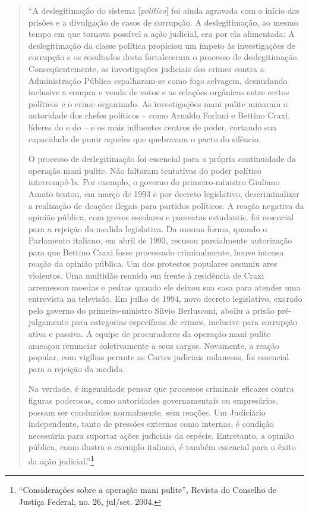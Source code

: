 \begin{quote}
``A deslegitimação do sistema {[}\emph{político}{]} foi ainda agravada
com o início das prisões e a divulgação de casos de corrupção. A
deslegitimação, ao mesmo tempo em que tornava possível a ação judicial,
era por ela alimentada: A deslegitimação da classe política propiciou um
ímpeto às investigações de corrupção e os resultados desta fortaleceram
o processo de deslegitimação. Conseqüentemente, as investigações
judiciais dos crimes contra a Administração Pública espalharam-se como
fogo selvagem, desnudando inclusive a compra e venda de votos e as
relações orgânicas entre certos políticos e o crime organizado. As
investigações mani pulite minaram a autoridade dos chefes políticos --
como Arnaldo Forlani e Bettino Craxi, líderes do  e do  -- e os
mais influentes centros de poder, cortando sua capacidade de punir
aqueles que quebravam o pacto do silêncio.

O processo de deslegitimação foi essencial para a própria continuidade
da operação mani pulite. Não faltaram tentativas do poder político
interrompê-la. Por exemplo, o governo do primeiro-ministro Giuliano
Amato tentou, em março de 1993 e por decreto legislativo,
descriminalizar a realização de doações ilegais para partidos políticos.
A reação negativa da opinião pública, com greves escolares e passeatas
estudantis, foi essencial para a rejeição da medida legislativa. Da
mesma forma, quando o Parlamento italiano, em abril de 1993, recusou
parcialmente autorização para que Bettino Craxi fosse processado
criminalmente, houve intensa reação da opinião pública. Um dos protestos
populares assumiu ares violentos. Uma multidão reunida em frente à
residência de Craxi arremessou moedas e pedras quando ele deixou sua
casa para atender uma entrevista na televisão. Em julho de 1994, novo
decreto legislativo, exarado pelo governo do primeiro-ministro Silvio
Berlusconi, aboliu a prisão pré-julgamento para categorias específicas
de crimes, inclusive para corrupção ativa e passiva. A equipe de
procuradores da operação mani pulite ameaçou renunciar coletivamente a
seus cargos. Novamente, a reação popular, com vigílias perante as Cortes
judiciais milanesas, foi essencial para a rejeição da medida.

Na verdade, é ingenuidade pensar que processos criminais eficazes contra
figuras poderosas, como autoridades governamentais ou empresários,
possam ser conduzidos normalmente, sem reações. Um Judiciário
independente, tanto de pressões externas como internas, é condição
necessária para suportar ações judiciais da espécie. Entretanto, a
opinião pública, como ilustra o exemplo italiano, é também essencial
para o êxito da ação judicial.''\footnote{``Considerações sobre a
  operação mani pulite'', Revista do Conselho de Justiça Federal, no.
  26, jul/set. 2004.}
\end{quote}

